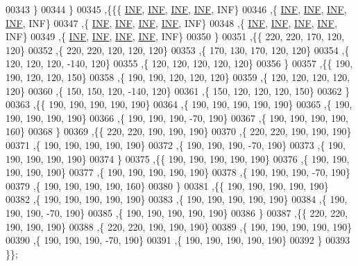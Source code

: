 \begin{DoxyCode}
00343   \}
00344  \}
00345 ,\{\{\{   \hyperlink{constants_8h_a12c2040f25d8e3a7b9e1c2024c618cb6}{INF},   \hyperlink{constants_8h_a12c2040f25d8e3a7b9e1c2024c618cb6}{INF},   \hyperlink{constants_8h_a12c2040f25d8e3a7b9e1c2024c618cb6}{INF},   \hyperlink{constants_8h_a12c2040f25d8e3a7b9e1c2024c618cb6}{INF},   INF\}
00346   ,\{   \hyperlink{constants_8h_a12c2040f25d8e3a7b9e1c2024c618cb6}{INF},   \hyperlink{constants_8h_a12c2040f25d8e3a7b9e1c2024c618cb6}{INF},   \hyperlink{constants_8h_a12c2040f25d8e3a7b9e1c2024c618cb6}{INF},   \hyperlink{constants_8h_a12c2040f25d8e3a7b9e1c2024c618cb6}{INF},   INF\}
00347   ,\{   \hyperlink{constants_8h_a12c2040f25d8e3a7b9e1c2024c618cb6}{INF},   \hyperlink{constants_8h_a12c2040f25d8e3a7b9e1c2024c618cb6}{INF},   \hyperlink{constants_8h_a12c2040f25d8e3a7b9e1c2024c618cb6}{INF},   \hyperlink{constants_8h_a12c2040f25d8e3a7b9e1c2024c618cb6}{INF},   INF\}
00348   ,\{   \hyperlink{constants_8h_a12c2040f25d8e3a7b9e1c2024c618cb6}{INF},   \hyperlink{constants_8h_a12c2040f25d8e3a7b9e1c2024c618cb6}{INF},   \hyperlink{constants_8h_a12c2040f25d8e3a7b9e1c2024c618cb6}{INF},   \hyperlink{constants_8h_a12c2040f25d8e3a7b9e1c2024c618cb6}{INF},   INF\}
00349   ,\{   \hyperlink{constants_8h_a12c2040f25d8e3a7b9e1c2024c618cb6}{INF},   \hyperlink{constants_8h_a12c2040f25d8e3a7b9e1c2024c618cb6}{INF},   \hyperlink{constants_8h_a12c2040f25d8e3a7b9e1c2024c618cb6}{INF},   \hyperlink{constants_8h_a12c2040f25d8e3a7b9e1c2024c618cb6}{INF},   INF\}
00350   \}
00351  ,\{\{   220,   220,   170,   120,   120\}
00352   ,\{   220,   220,   120,   120,   120\}
00353   ,\{   170,   130,   170,   120,   120\}
00354   ,\{   120,   120,   120,  -140,   120\}
00355   ,\{   120,   120,   120,   120,   120\}
00356   \}
00357  ,\{\{   190,   190,   120,   120,   150\}
00358   ,\{   190,   190,   120,   120,   120\}
00359   ,\{   120,   120,   120,   120,   120\}
00360   ,\{   150,   150,   120,  -140,   120\}
00361   ,\{   150,   120,   120,   120,   150\}
00362   \}
00363  ,\{\{   190,   190,   190,   190,   190\}
00364   ,\{   190,   190,   190,   190,   190\}
00365   ,\{   190,   190,   190,   190,   190\}
00366   ,\{   190,   190,   190,   -70,   190\}
00367   ,\{   190,   190,   190,   190,   160\}
00368   \}
00369  ,\{\{   220,   220,   190,   190,   190\}
00370   ,\{   220,   220,   190,   190,   190\}
00371   ,\{   190,   190,   190,   190,   190\}
00372   ,\{   190,   190,   190,   -70,   190\}
00373   ,\{   190,   190,   190,   190,   190\}
00374   \}
00375  ,\{\{   190,   190,   190,   190,   190\}
00376   ,\{   190,   190,   190,   190,   190\}
00377   ,\{   190,   190,   190,   190,   190\}
00378   ,\{   190,   190,   190,   -70,   190\}
00379   ,\{   190,   190,   190,   190,   160\}
00380   \}
00381  ,\{\{   190,   190,   190,   190,   190\}
00382   ,\{   190,   190,   190,   190,   190\}
00383   ,\{   190,   190,   190,   190,   190\}
00384   ,\{   190,   190,   190,   -70,   190\}
00385   ,\{   190,   190,   190,   190,   190\}
00386   \}
00387  ,\{\{   220,   220,   190,   190,   190\}
00388   ,\{   220,   220,   190,   190,   190\}
00389   ,\{   190,   190,   190,   190,   190\}
00390   ,\{   190,   190,   190,   -70,   190\}
00391   ,\{   190,   190,   190,   190,   190\}
00392   \}
00393  \}\};
\end{DoxyCode}
